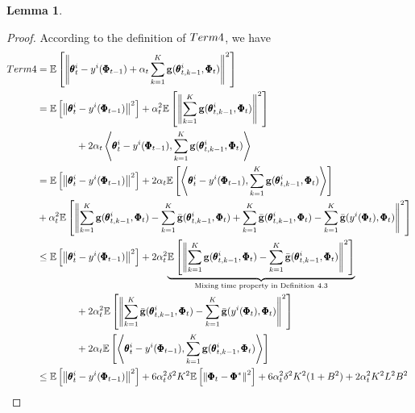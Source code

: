 \documentclass{article} %
\theoremstyle{plain}
\newtheorem{lemma}[theorem]{Lemma}
\theoremstyle{definition}
\theoremstyle{remark}
\begin{document}
{\begin{lemma}
\end{lemma}

\begin{proof}
According to the definition of $\textnormal{Term 4}$, we have 
\begin{align}\label{eq:37}
    \textnormal{Term 4}&=\mathbb{E} \left[\left\|\pmb{\theta}_{t}^i-y^i(\pmb{\Phi}_{t-1})+\alpha_t\sum_{k=1}^K\bg(\pmb{\theta}_{t,k-1}^i,\pmb{\Phi}_t)\right\|^2\right]\nonumber\allowdisplaybreaks\\
    &=\mathbb{E}\left[\left\|\pmb{\theta}_{t}^i-y^i(\pmb{\Phi}_{t-1})\right\|^2\right]+\alpha_t^2\mathbb{E}\left[\left\|\sum_{k=1}^K\bg(\pmb{\theta}_{t,k-1}^i,\pmb{\Phi}_t)\right\|^2\right]\nonumber\allowdisplaybreaks\\
    &\qquad\qquad+2\alpha_t\left\langle\pmb{\theta}_{t}^i-y^i(\pmb{\Phi}_{t-1}), \sum_{k=1}^K\bg(\pmb{\theta}_{t,k-1}^i,\pmb{\Phi}_t)\right\rangle\nonumber\allowdisplaybreaks\\
    &=\mathbb{E}\left[\left\|\pmb{\theta}_{t}^i-y^i(\pmb{\Phi}_{t-1})\right\|^2\right]+2\alpha_t\mathbb{E}\left[\left\langle\pmb{\theta}_{t}^i-y^i(\pmb{\Phi}_{t-1}), \sum_{k=1}^K\bg(\pmb{\theta}_{t,k-1}^i,\pmb{\Phi}_t)\right\rangle\right]\nonumber\allowdisplaybreaks\\
    &+\alpha_t^2\mathbb{E}\left[\left\|\sum_{k=1}^K\bg(\pmb{\theta}_{t,k-1}^i,\pmb{\Phi}_t)-\sum_{k=1}^K\bar{\bg}(\pmb{\theta}_{t,k-1}^i,\pmb{\Phi}_t)+\sum_{k=1}^K\bar{\bg}(\pmb{\theta}_{t,k-1}^i,\pmb{\Phi}_t)-\sum_{k=1}^K\bar{\bg}(y^i(\pmb{\Phi}_{t}),\pmb{\Phi}_t)\right\|^2\right]\nonumber\allowdisplaybreaks\\
    &\leq \mathbb{E}\left[\left\|\pmb{\theta}_{t}^i-y^i(\pmb{\Phi}_{t-1})\right\|^2\right]+2\alpha_t^2\underset{\text{Mixing time property in Definition}~4.3}{\underbrace{\mathbb{E}\left[\left\|\sum_{k=1}^K\bg(\pmb{\theta}_{t,k-1}^i,\pmb{\Phi}_t)-\sum_{k=1}^K\bar{\bg}(\pmb{\theta}_{t,k-1}^i,\pmb{\Phi}_t)\right\|^2\right]}}\nonumber\allowdisplaybreaks\\
    &\qquad\qquad+2\alpha_t^2\mathbb{E}\left[\left\|\sum_{k=1}^K\bar{\bg}(\pmb{\theta}_{t,k-1}^i,\pmb{\Phi}_t)-\sum_{k=1}^K\bar{\bg}(y^i(\pmb{\Phi}_{t}),\pmb{\Phi}_t)\right\|^2\right]\nonumber\allowdisplaybreaks\\
    &\qquad\qquad+2\alpha_t\mathbb{E}\left[\left\langle\pmb{\theta}_{t}^i-y^i(\pmb{\Phi}_{t-1}), \sum_{k=1}^K\bg(\pmb{\theta}_{t,k-1}^i,\pmb{\Phi}_t)\right\rangle\right]\nonumber\allowdisplaybreaks\\
    &\leq \mathbb{E}\left[\left\|\pmb{\theta}_{t}^i-y^i(\pmb{\Phi}_{t-1})\right\|^2\right]+6\alpha_t^2\delta^2K^2\mathbb{E}\left[\left\|\pmb{\Phi}_t-\pmb{\Phi}^*\right\|^2\right]+6\alpha_t^2\delta^2K^2(1+B^2)+2\alpha_t^2K^2L^2B^2\nonumber\allowdisplaybreaks\\

\end{align}
\end{proof}}
\end{document}
